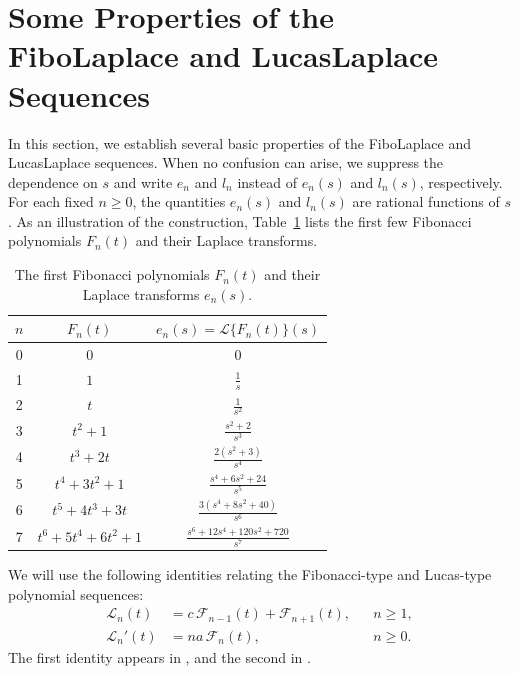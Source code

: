 \documentclass[11pt]{amsart}
\newcommand{\Ft}[1]{\mathscr{F}_{#1}}
\newcommand{\Lt}[1]{\mathscr{L}_{#1}}
\theoremstyle{plain}
\numberwithin{equation}{section}
\begin{document}
\section{Some Properties of the FiboLaplace and LucasLaplace Sequences}

In this section, we establish several basic properties of the FiboLaplace and LucasLaplace sequences. When no confusion can arise, we suppress the dependence on $s$ and write $e_n$ and $l_n$ instead of $e_n(s)$ and $l_n(s)$, respectively. For each fixed $n\geq 0$, the quantities $e_n(s)$ and $l_n(s)$ are rational functions of $s$. As an illustration of the construction, Table~\ref{tab:example-FiboLaplace} lists the first few Fibonacci polynomials $F_n(t)$ and their Laplace transforms.

\begin{table}[ht!]
\centering
\renewcommand{\arraystretch}{1.25}
\setlength{\tabcolsep}{6pt}
\begin{tabular}{c|c|c}
\hline
$n$ & $F_n(t)$ & $e_n(s)=\mathcal{L}\{F_n(t)\}(s)$ \\
\hline\hline
0 & $0$ & $0$ \\
1 & $1$ & $\frac{1}{s}$ \\
2 & $t$ & $\frac{1}{s^{2}}$ \\
3 & $t^{2}+1$ & $\frac{s^{2}+2}{s^{3}}$ \\
4 & $t^{3}+2t$ & $\frac{2(s^{2}+3)}{s^{4}}$ \\
5 & $t^{4}+3t^{2}+1$ & $\frac{s^{4}+6s^{2}+24}{s^{5}}$ \\
6 & $t^{5}+4t^{3}+3t$ & $\frac{3(s^{4}+8s^{2}+40)}{s^{6}}$ \\
7 & $t^{6}+5t^{4}+6t^{2}+1$ & $\frac{s^{6}+12s^{4}+120s^{2}+720}{s^{7}}$ \\
\hline
\end{tabular}
\caption{The first Fibonacci polynomials $F_n(t)$ and their Laplace transforms $e_n(s)$.}
\label{tab:example-FiboLaplace}
\end{table}


We will use the following identities relating the Fibonacci-type and Lucas-type polynomial sequences:
\begin{align}
\Lt{n}(t)
&=
c\,\Ft{n-1}(t)+\Ft{n+1}(t),
&& n\geq 1,
\label{IdentidadLucaFibonacci}
\\
\Lt{n}'(t)
&=
na\,\Ft{n}(t),
&& n\geq 0.
\label{IdentidadRelaciónDerivadas}
\end{align}
The first identity appears in
\cite[Identity~2]{FlorezMcAnallyMuk}, and the second in
\cite{florezHiguitaRamirez}.
\end{document}

